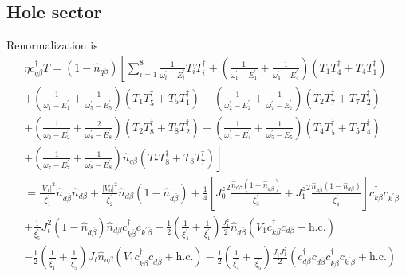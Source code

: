 \documentclass[twoside]{report}
\numberwithin{equation}{section}
\begin{document}
\subsection{Hole sector}
Renormalization is
\begin{equation}\begin{aligned}
&\eta c^\dagger_{q\beta}T = \left( 1 - \hat n_{q\beta} \right) \left[\sum_{i=1}^8\frac{1}{\omega^\prime_i - E^\prime_i} T_i T_i^\dagger +\left(\frac{1}{\omega^\prime_1 - E^\prime_1} + \frac{1}{\omega^\prime_4 - E^\prime_4}\right) \left(T_1 T_4^\dagger + T_4 T_1^\dagger \right)\right. \\
&\left. +\left(\frac{1}{\omega^\prime_1 - E^\prime_1} + \frac{1}{\omega^\prime_5 - E^\prime_5}\right) \left(T_1 T_5^\dagger + T_5 T_1^\dagger \right) + \left(\frac{1}{\omega^\prime_2 - E^\prime_2} + \frac{1}{\omega^\prime_7 - E^\prime_7}\right) \left(T_2 T_7^\dagger + T_7 T_2^\dagger \right) \right.\\
&\left. + \left(\frac{1}{\omega^\prime_2 - E^\prime_2} + \frac{2}{\omega^\prime_8 - E^\prime_8}\right) \left(T_2 T_8^\dagger + T_8 T_2^\dagger \right) + \left(\frac{1}{\omega^\prime_4 - E^\prime_4} + \frac{1}{\omega^\prime_5 - E^\prime_5}\right) \left(T_4 T_5^\dagger + T_5 T_4^\dagger \right) \right.\\
&\left. + \left(\frac{1}{\omega^\prime_7 - E^\prime_7} + \frac{1}{\omega^\prime_8 - E^\prime_8}\right)\hat n_{q\beta} \left(T_7 T_8^\dagger + T_8 T_7^\dagger \right)\right]\\
	&=\frac{|V_1|^2}{\xi^\prime_1}\hat n_{d\overline\beta}\hat n_{d\beta} + \frac{|V_0|^2}{\xi^\prime_2}\hat n_{d\beta}\left(1 - \hat n_{d\overline\beta}\right)+\frac{1}{4}\left[ {J_0^z}^2\frac{\hat n_{d\beta}\left( 1 - \hat n_{d\overline\beta} \right) }{\xi^\prime_3} + {J_1^z}^2\frac{\hat n_{d\overline\beta}\left( 1 - \hat n_{d\beta} \right)}{\xi^\prime_4} \right]c^\dagger_{k\beta}c_{k^\prime\beta} \\
	&+ \frac{1}{\xi^\prime_5}J_t^2 \left( 1 - \hat n_{d\overline\beta} \right) \hat n_{d\beta} c^\dagger_{k\overline\beta} c_{k^\prime\overline\beta} - \frac{1}{2} \left(\frac{1}{\xi^\prime_4} + \frac{1}{\xi^\prime_1}\right)\frac{J_1^z}{2}\hat n_{d\overline\beta} \left(V_1 c^\dagger_{k\beta}c_{d\beta} + \text{h.c.}\right) \\
	&- \frac{1}{2}\left(\frac{1}{\xi^\prime_1} + \frac{1}{\xi^\prime_5}\right)J_t \hat n_{d\beta}\left(V_1 c^\dagger_{k\overline\beta}c_{d\overline\beta} + \text{h.c.}\right) - \frac{1}{2}\left(\frac{1}{\xi^\prime_4} + \frac{1}{\xi^\prime_5}\right)\frac{J_t J^z_1}{2}\left(c^\dagger_{d\beta}c_{d\overline\beta}c^\dagger_{k\overline\beta}c_{k^\prime\beta} + \text{h.c.}\right)\\

\end{aligned}
\end{equation}
\end{document}
